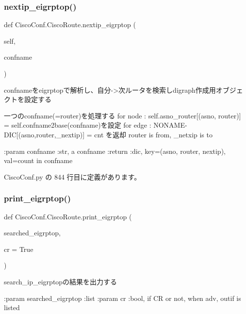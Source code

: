 \subsubsection{\texorpdfstring{nextip\_eigrptop()}{nextip\_eigrptop()}}
{\footnotesize\ttfamily def Cisco\+Conf.\+Cisco\+Route.\+nextip\+\_\+eigrptop (\begin{DoxyParamCaption}\item[{}]{self,  }\item[{}]{confname }\end{DoxyParamCaption})}

\begin{DoxyVerb}confnameをeigrptopで解析し、自分->次ルータを検索しdigraph作成用オブジェクトを設定する

一つのconfname(=router)を処理する
    for node : self.asno_router[(asno, router)] = self.confname2base(confname)を設定
    for edge : NONAME-DIC[(asno,router,_nextip)] = cnt を返却
      router is from, _netxip is to

:param  confname :str, a confname
:return :dic, key=(asno, router, nextip), val=count in confname
\end{DoxyVerb}
 

 Cisco\+Conf.\+py の 844 行目に定義があります。

\mbox{\label{classCiscoConf_1_1CiscoRoute_aa9983974c890f778cc4380f8caaede02}} 
\subsubsection{\texorpdfstring{print\_eigrptop()}{print\_eigrptop()}}
{\footnotesize\ttfamily def Cisco\+Conf.\+Cisco\+Route.\+print\+\_\+eigrptop (\begin{DoxyParamCaption}\item[{}]{searched\+\_\+eigrptop,  }\item[{}]{cr = {\ttfamily True} }\end{DoxyParamCaption})\hspace{0.3cm}{\ttfamily [static]}}

\begin{DoxyVerb}search_ip_eigrptopの結果を出力する

:param searched_eigrptop :list
:param cr                :bool, if CR or not, when adv, outif is listed
\end{DoxyVerb}
 

